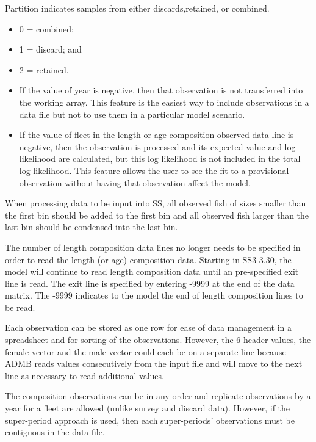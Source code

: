 Partition indicates samples from either discards,retained, or combined.
	\begin{itemize}
		\item 0 = combined;
		\item 1 = discard; and
		\item 2 = retained.
	\end{itemize}

	\begin{itemize}
		\item If the value of year is negative, then that observation is not transferred into the working array. This feature is the easiest way to include observations in a data file but not to use them in a particular model scenario.
		\item If the value of fleet in the length or age composition observed data line is negative, then the observation is processed and its expected value and log likelihood are calculated, but this log likelihood is not included in the total log likelihood. This feature allows the user to see the fit to a provisional observation without having that observation affect the model.
	\end{itemize}

When processing data to be input into SS, all observed fish of sizes smaller than the first bin should be added to the first bin and all observed fish larger than the last bin should be condensed into the last bin.	

The number of length composition data lines no longer needs to be specified in order to read the length (or age) composition data. Starting in SS3 3.30, the model will continue to read length composition data until an pre-specified exit line is read.  The exit line is specified by entering -9999 at the end of the data matrix. The -9999 indicates to the model the end of length composition lines to be read.

Each observation can be stored as one row for ease of data management in a spreadsheet and for sorting of the observations.  However, the 6 header values, the female vector and the male vector could each be on a separate line because ADMB reads values consecutively from the input file and will move to the next line as necessary to read additional values.

The composition observations can be in any order and replicate observations by a year for a fleet are allowed (unlike survey and discard data).  However, if the super-period approach is used, then each super-periods' observations must be contiguous in the data file.

